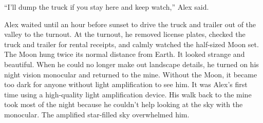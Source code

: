 ``I'll dump the truck if you stay here and keep watch,'' Alex said.

Alex waited until an hour before sunset to drive the truck and trailer
out of the valley to the turnout. At the turnout, he removed license
plates, checked the truck and trailer for rental receipts, and calmly
watched the half-sized Moon set. The Moon hung twice its normal distance
from Earth. It looked strange and beautiful. When he could no longer
make out landscape details, he turned on his night vision monocular and
returned to the mine. Without the Moon, it became too dark for anyone
without light amplification to see him. It was Alex's first time using a
high-quality light amplification device. His walk back to the mine took
most of the night because he couldn't help looking at the sky with the
monocular. The amplified star-filled sky overwhelmed him.


%

